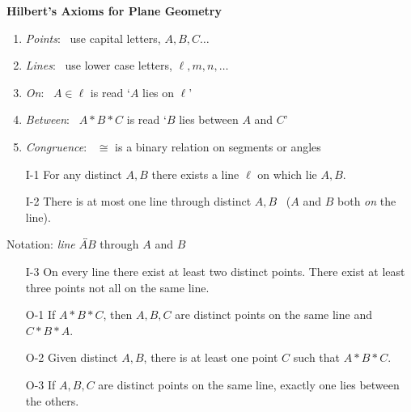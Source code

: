 \begin{center}
\bfseries\Large Hilbert's Axioms for Plane Geometry
\end{center}

\begin{minipage}[t]{0.46\linewidth}
\begin{enumerate}\itemsep2pt
  \item \emph{Points}: \ use capital letters, $A,B,C\ldots$
  \item \emph{Lines}: \ use lower case letters, $\ell,m,n,\ldots$
  \item \emph{On}: \ $A\in\ell$ is read `$A$ lies on $\ell$'
  \item \emph{Between}: \ $A*B*C$ is read `$B$ lies between $A$ and $C$'
  \item \emph{Congruence}: \ $\cong$ is a binary relation on segments or angles
\end{enumerate}


\begin{enumerate}
	\item[I-1] For any distinct $A,B$ there exists a line $\ell$ on which lie $A,B$.
	\item[I-2] There is at most one line through distinct $A,B$ \ ($A$ and $B$ both \emph{on} the line).
\end{enumerate}\vspace{-2pt}
	
Notation: \emph{line} $\overleftrightarrow{AB}$ through $A$ and $B$\vspace{-2pt}

\begin{enumerate}\setcounter{enumi}{2}	
	\item[I-3] On every line there exist at least two distinct points. There exist at least three points not all on the same line.
\end{enumerate}



\begin{enumerate}
	\item[O-1] If $A*B*C$, then $A,B,C$ are distinct points on the same line and $C*B*A$.
	\item[O-2] Given distinct $A,B$, there is at least one point $C$ such that $A*B*C$.
	\item[O-3] If $A,B,C$ are distinct points on the same line, exactly one lies between the others.
\end{enumerate}\vspace{-2pt}
	

\end{minipage}
